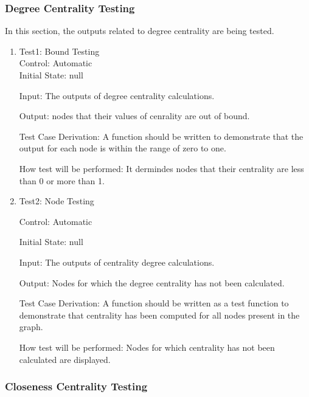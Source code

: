 \documentclass[12pt, titlepage]{article}
\begin{document}
					
					
					


\subsubsection{Degree Centrality Testing}

In this section, the outputs related to degree centrality are being tested.
\begin{enumerate}

\item{Test1: Bound Testing\\}	
Control: Automatic\\				
Initial State: null
					
Input:  The outputs of degree centrality calculations.
					
Output: nodes that their values of cenrality are out of bound.

Test Case Derivation: A function should be written to demonstrate that the output for each node is within the range of zero to one.

How test will be performed: It dermindes nodes that their centrality are less than 0 or more than 1.
\item{Test2: Node Testing\\}

Control: Automatic
					
Initial State: null
					
Input: The outputs of centrality degree calculations.
					
Output: Nodes for which the degree centrality has not been calculated.

Test Case Derivation: A function should be written as a test function to demonstrate that centrality has been computed for all nodes present in the graph.

How test will be performed: Nodes for which centrality has not been calculated are displayed.


\end{enumerate}
\subsubsection{Closeness Centrality Testing}
\end{document}
